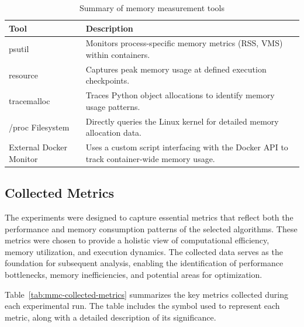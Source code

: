 \begin{table}[h]
    \centering
    \begin{tabular}{|l|p{7cm}|}
        \hline
        \textbf{Tool}           & \textbf{Description}                                                                            \\ \hline
        psutil                  & Monitors process-specific memory metrics (\ac{RSS}, \ac{VMS}) within containers.                \\ \hline
        resource                & Captures peak memory usage at defined execution checkpoints.                                    \\ \hline
        tracemalloc             & Traces Python object allocations to identify memory usage patterns.                             \\ \hline
        /proc Filesystem        & Directly queries the Linux kernel for detailed memory allocation data.                          \\ \hline
        External Docker Monitor & Uses a custom script interfacing with the Docker \ac{API} to track container-wide memory usage. \\ \hline
    \end{tabular}
    \caption{Summary of memory measurement tools}
    \label{tab:mmc-memory-measurement-tools}
\end{table}

\subsection{Collected Metrics}
\label{subsec:mmc-collected-metrics}

The experiments were designed to capture essential metrics that reflect both the performance and memory consumption patterns of the selected algorithms.
These metrics were chosen to provide a holistic view of computational efficiency, memory utilization, and execution dynamics.
The collected data serves as the foundation for subsequent analysis, enabling the identification of performance bottlenecks, memory inefficiencies, and potential areas for optimization.

Table~\ref{tab:mmc-collected-metrics} summarizes the key metrics collected during each experimental run.
The table includes the symbol used to represent each metric, along with a detailed description of its significance.

